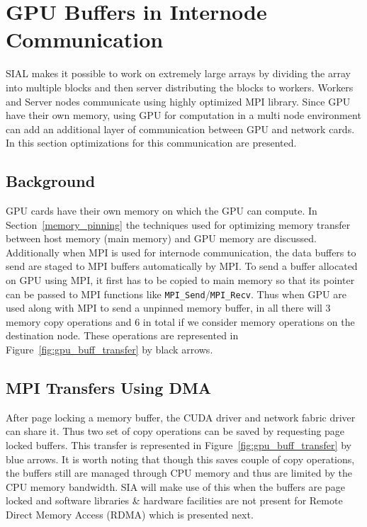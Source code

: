 \section{GPU Buffers in Internode Communication}
SIAL makes it possible to work on extremely large arrays by dividing the array into
multiple blocks and then server distributing the blocks to workers. Workers and
Server nodes communicate using highly optimized MPI library. Since GPU have their
own memory, using GPU for computation in a multi node environment can add an
additional layer of communication between GPU and network cards. In this section
optimizations for this communication are presented.

\subsection{Background}
GPU cards have their own memory on which the GPU can compute. In
Section~\ref{memory_pinning} the techniques used for optimizing memory transfer
between host memory (main memory) and GPU memory are discussed. Additionally when
MPI is used for internode communication, the data buffers to send are staged
to MPI buffers automatically by MPI. To send a buffer allocated on GPU using MPI,
it first has to be copied to main memory so that its pointer can be passed to
MPI functions like \texttt{MPI\_Send}/\texttt{MPI\_Recv}. Thus when GPU are used
along with MPI to send a unpinned memory buffer, in all there will 3 memory copy
operations and 6 in total if we consider memory operations on the destination node.
These operations are represented in Figure~\ref{fig:gpu_buff_transfer} by black arrows.

\subsection{MPI Transfers Using DMA}
After page locking a memory buffer, the CUDA driver and network fabric driver can
share it. Thus two set of copy operations can be saved by requesting page locked
buffers. This transfer is represented in Figure~\ref{fig:gpu_buff_transfer} by blue
arrows. It is worth noting that though this saves couple of copy operations, the
buffers still are managed through CPU memory and thus are limited by the CPU
memory bandwidth. SIA will make use of this when the buffers are page locked and
software libraries \& hardware facilities are not present for Remote Direct Memory
Access (RDMA) which is
presented next.


